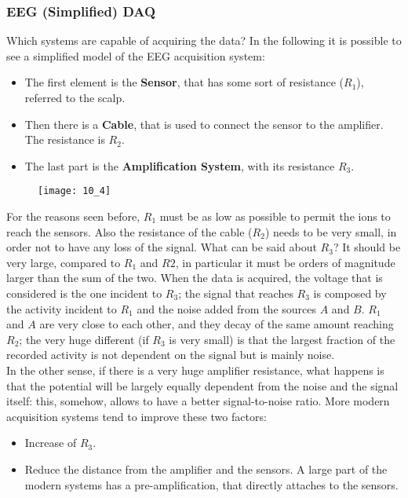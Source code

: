 \subsubsection{EEG (Simplified) DAQ}
Which systems are capable of acquiring the data? In the following it is possible to see a simplified model of 
the EEG acquisition system:
\begin{itemize}
    \item The first element is the \textbf{Sensor}, that has some sort of resistance (\(R_1\)), referred to 
    the scalp.
    \item Then there is a \textbf{Cable}, that is used to connect the sensor to the amplifier. 
    The resistance is \(R_2\).
    \item The last part is the \textbf{Amplification System}, with its resistance \(R_3\).
\end{itemize}
\begin{figure}[H]
    \texttt{[image: 10\_4]}
    \centering
\end{figure}
For the reasons seen before, \(R_1\) must be as low as possible to permit the ions to reach the sensors. Also the 
resistance of the cable (\(R_2\)) needs to be very small, in order not to have any loss of the signal. What can be 
said about \(R_3\)? It should be very large, compared to \(R_1\) and \(R2\), in particular it must be orders of 
magnitude larger than the sum of the two. When the data is acquired, the voltage that is considered is the one 
incident to \(R_3\); the signal that reaches \(R_3\) is composed by the activity incident to \(R_1\) and the noise 
added from the sources \(A\) and \(B\). \(R_1\) and \(A\) are very close to each other, and they decay of the same 
amount reaching \(R_2\); the very huge different (if \(R_3\) is very small) is that the largest fraction of the recorded 
activity is not dependent on the signal but is mainly noise. \\
In the other sense, if there is a very huge amplifier resistance, what happens is that the potential will be largely equally 
dependent from the noise and the signal itself: this, somehow, allows to have a better signal-to-noise ratio.
More modern acquisition systems tend to improve these two factors:
\begin{itemize}
    \item Increase of \(R_3\).
    \item Reduce the distance from the amplifier and the sensors. A large part of the modern systems has a pre-amplification, 
    that directly attaches to the sensors.
\end{itemize}

